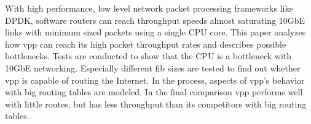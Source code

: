 \small

With high performance, low level network packet processing frameworks
like DPDK, software routers can reach throughput speeds almost
saturating 10GbE links with minimum sized packets using a single CPU
core. This paper analyzes how \Ac{vpp} can reach its high packet
throughput rates and describes possible bottlenecks. Tests are
conducted to show that the CPU is a bottleneck with 10GbE networking.
Especially different \Ac{fib} sizes are tested to find out whether
\Ac{vpp} is capable of routing the Internet. In the process, aspects
of \Ac{vpp}'s behavior with big routing tables are modeled. In the
final comparison \Ac{vpp} performs well with little routes, but has
less throughput than its competitors with big routing tables.


